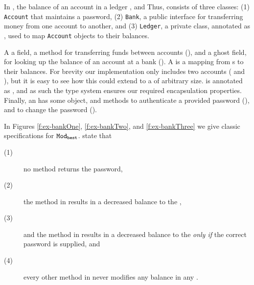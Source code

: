  
In \ModD,   the balance 
of an account  in a ledger , and  
 Thus, 
 \ModD   consists of three classes: (1) \texttt{Account} that
maintains a password, (2) \texttt{Bank}, a public interface 
for transferring money from one account to another, and (3) \texttt{Ledger},
a private class, annotated as \enclosed, used to map \texttt{Account} objects
to their balances.  
 

A    a  field, a method for transferring 
funds between accounts (), and a ghost field,  
for looking up the balance of an account at a bank ().
A  is
a mapping from s to their balances. For brevity
our implementation only includes two accounts ( and ),
but it is easy to see how this could extend to a 
of arbitrary size.  is annotated as \enclosed, and as 
such the type system ensures our required encapsulation properties.
Finally, an  has some  object, and 
methods to authenticate a provided password (), 
and to change the password ().

 

In Figures \ref{f:ex-bankOne},  \ref{f:ex-bankTwo}, and  \ref{f:ex-bankThree}  we give  classic specifications for ${\texttt{Mod}}_{{\texttt{best}}}$.
  state that 
\begin{description}
\item[(1)] no method returns the password, 
\item[(2)] the  method in  results in a decreased balance to the  ,
\item[(3)] and the  method in  results in a decreased balance to the   \emph{only if} the correct password is supplied, and
\item[(4)] every other method in \ModD never modifies any balance in any .
\end{description} 



